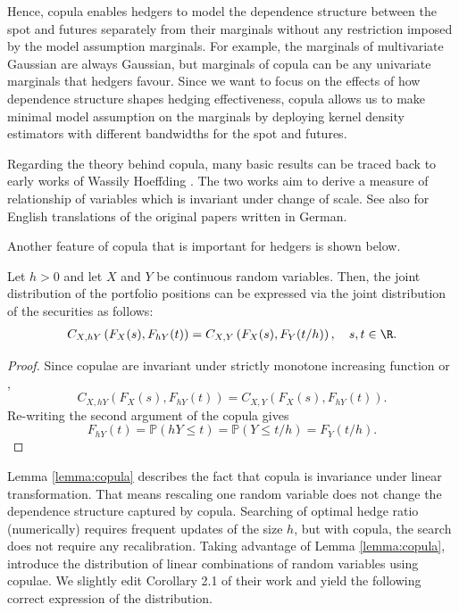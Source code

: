 \documentclass[11pt,a4paper,english]{article}
\begin{document}
Hence, copula enables hedgers to model the dependence structure between the spot and futures separately from their marginals 
without any restriction imposed by the model assumption marginals.
For example, the marginals of multivariate Gaussian are always Gaussian, but marginals of copula can be any univariate marginals that hedgers favour. 
Since we want to focus on the effects of how dependence structure shapes hedging effectiveness, copula allows us to
make minimal model assumption on the marginals by deploying kernel density estimators with different bandwidths for the spot and futures. 

Regarding the theory behind copula, many basic results can be traced back to early
works of Wassily Hoeffding \citep{hoedffding1940, hoedffding1941}. 
The two works aim to derive a measure of relationship of variables which is invariant under change of scale. 
See also \citet{hoeffding2012collected} for English translations of
the original papers written in German. 

Another feature of copula that is important for hedgers is shown below. 

\begin{lemma}
  \label{lemma:copula}
  Let $h>0$ and let $X$ and $Y$ be continuous random variables. Then,
  the joint distribution of the portfolio positions 
  can be expressed via the joint distribution of the securities as
  follows:
  \begin{align}
  C_{X, hY}\left(F_X(s),F_{hY}(t)\right) = C_{X,
    Y}\left(F_X(s),F_{Y}(t/h)\right), \quad s,t\in \R.
    \end{align}
  \end{lemma}

\begin{proof}
  Since copulae are invariant under strictly monotone increasing
  function \citet[Theorem 3 (i)]{schweizer1981nonparametric} or
  \citet[Theorem 2.4.3]{Nelsen1999}, 
  \begin{equation*}
    C_{X, hY}\left(F_X(s),F_{hY}(t)\right) = C_{X, Y}\left(F_X(s),F_{hY}(t)\right).
    \end{equation*}
Re-writing the second argument of the copula gives
\begin{equation*}
  F_{hY}(t) = \mathbb{P}(hY \leq t)
  = \mathbb{P}(Y \leq t/h)
  = F_Y(t/h).
\end{equation*}
\end{proof}

Lemma \ref{lemma:copula} describes the fact that copula is invariance under linear transformation.
That means rescaling one random variable does not change the dependence structure captured by copula. 
Searching of optimal hedge ratio (numerically) requires frequent updates of the size $h$,
but with copula, the search does not require any recalibration.
Taking advantage of Lemma \ref{lemma:copula}, \citet{barbi2014copula}
introduce the distribution of linear combinations of random variables
using copulae. 
We slightly edit Corollary 2.1 of their work and yield the 
following correct expression of the distribution. 
\end{document}
